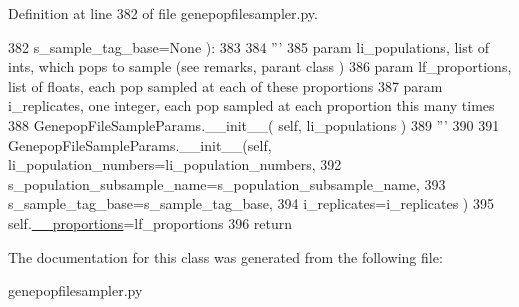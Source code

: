 Definition at line 382 of file genepopfilesampler.\+py.


\begin{DoxyCode}
382             s\_sample\_tag\_base=\textcolor{keywordtype}{None} ):
383 
384         \textcolor{stringliteral}{'''}
385 \textcolor{stringliteral}{        param li\_populations, list of ints, which pops to sample (see remarks, parant class )}
386 \textcolor{stringliteral}{        param lf\_proportions, list of floats, each pop sampled at each of these proportions}
387 \textcolor{stringliteral}{        param i\_replicates, one integer, each pop sampled at each proportion this many times}
388 \textcolor{stringliteral}{        GenepopFileSampleParams.\_\_init\_\_( self, li\_populations )}
389 \textcolor{stringliteral}{        '''}
390 
391         GenepopFileSampleParams.\_\_init\_\_(self, li\_population\_numbers=li\_population\_numbers, 
392                                             s\_population\_subsample\_name=s\_population\_subsample\_name,
393                                             s\_sample\_tag\_base=s\_sample\_tag\_base,
394                                             i\_replicates=i\_replicates )
395         self.\hyperlink{classnegui_1_1genepopfilesampler_1_1GenepopFileSampleParamsProportion_aa8dd8cef783da4e9bdb7c550e56382fd}{\_\_proportions}=lf\_proportions
396         \textcolor{keywordflow}{return}
\end{DoxyCode}


The documentation for this class was generated from the following file\+:\begin{DoxyCompactItemize}
\item 
genepopfilesampler.\+py\end{DoxyCompactItemize}

